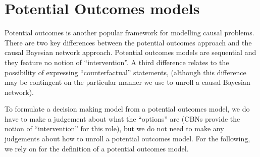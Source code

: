 
\section{Potential Outcomes models}\label{sec:potential_outcomes}

Potential outcomes is another popular framework for modelling causal problems. There are two key differences between the potential outcomes approach and the causal Bayesian network approach. Potential outcomes models are sequential and they feature no notion of ``intervention''. A third difference relates to the possibility of expressing ``counterfactual'' statements, (although this difference may be contingent on the particular manner we use to unroll a causal Bayesian network).

To formulate a decision making model from a potential outcomes model, we do have to make a judgement about what the ``options'' are (CBNs provide the notion of ``intervention'' for this role), but we do not need to make any judgements about how to unroll a potential outcomes model. For the following, we rely on \citet{rubin_causal_2005} for the definition of a potential outcomes model.

